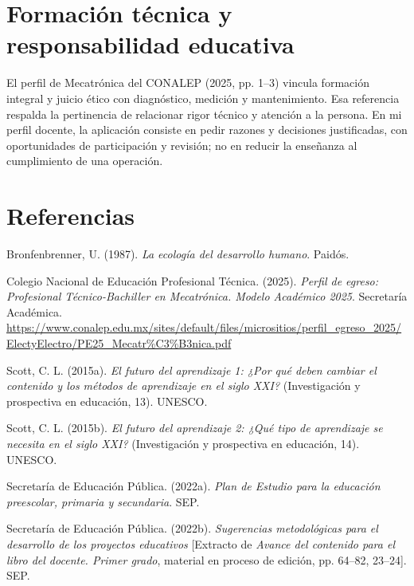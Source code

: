 \documentclass[spanish,letterpaper,oneside]{article}
\begin{document}
\section{Formación técnica y responsabilidad educativa}
El perfil de Mecatrónica del CONALEP (2025, pp. 1--3) vincula formación integral y juicio ético con diagnóstico, medición y mantenimiento. Esa referencia respalda la pertinencia de relacionar rigor técnico y atención a la persona. En mi perfil docente, la aplicación consiste en pedir razones y decisiones justificadas, con oportunidades de participación y revisión; no en reducir la enseñanza al cumplimiento de una operación.
\section*{Referencias}
{\setlength{\parskip}{6pt}
\par\hangindent=1.27cm  Bronfenbrenner, U. (1987). \textit{La ecología del desarrollo humano}. Paidós.
\par\hangindent=1.27cm Colegio Nacional de Educación Profesional Técnica. (2025). \textit{Perfil de egreso: Profesional Técnico-Bachiller en Mecatrónica. Modelo Académico 2025}. Secretaría Académica. \url{https://www.conalep.edu.mx/sites/default/files/micrositios/perfil_egreso_2025/ElectyElectro/PE25_Mecatr%C3%B3nica.pdf}
\par\hangindent=1.27cm  Scott, C. L. (2015a). \textit{El futuro del aprendizaje 1: ¿Por qué deben cambiar el contenido y los métodos de aprendizaje en el siglo XXI?} (Investigación y prospectiva en educación, 13). UNESCO.
\par\hangindent=1.27cm  Scott, C. L. (2015b). \textit{El futuro del aprendizaje 2: ¿Qué tipo de aprendizaje se necesita en el siglo XXI?} (Investigación y prospectiva en educación, 14). UNESCO.
\par\hangindent=1.27cm  Secretaría de Educación Pública. (2022a). \textit{Plan de Estudio para la educación preescolar, primaria y secundaria}. SEP.
\par\hangindent=1.27cm  Secretaría de Educación Pública. (2022b). \textit{Sugerencias metodológicas para el desarrollo de los proyectos educativos} [Extracto de \textit{Avance del contenido para el libro del docente. Primer grado}, material en proceso de edición, pp. 64--82, 23--24]. SEP.
}
\end{document}

